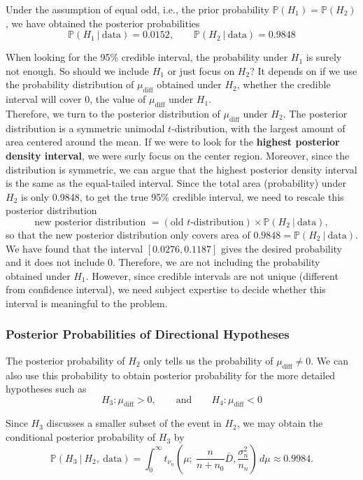 \documentclass{article}
\begin{document}
Under the assumption of equal odd, i.e., the prior probability $\mathbb{P}(H_1)=\mathbb{P}(H_2)$, we have obtained the posterior probabilities
$$ \mathbb{P}(H_1~|~\text{data}) = 0.0152,\qquad \mathbb{P}(H_2~|~\text{data}) = 0.9848 $$

When looking for the 95\% credible interval, the probability under $H_1$ is surely not enough. So should we include $H_1$ or just focus on $H_2$? It depends on if we use the probability distribution of $\mu_\text{diff}$ obtained under $H_2$, whether the credible interval will cover 0, the value of $\mu_\text{diff}$ under $H_1$.\\

Therefore, we turn to the posterior distribution of $\mu_\text{diff}$ under $H_2$. The posterior distribution is a symmetric unimodal $t$-distribution, with the largest amount of area centered around the mean. If we were to look for the \textbf{highest posterior density interval}, we were surly focus on the center region. Moreover, since the distribution is symmetric, we can argue that the highest posterior density interval is the same as the equal-tailed interval. Since the total area (probability) under $H_2$ is only 0.9848, to get the true 95\% credible interval, we need to rescale this posterior distribution 
$$ \text{new posterior distribution }= (\text{old $t$-distribution})\times\mathbb{P}(H_2~|~\text{data}), $$ so that the new posterior distribution only covers area of $0.9848 = \mathbb{P}(H_2~|~\text{data})$. We have found that the interval $[0.0276, 0.1187]$ gives the desired probability and it does not include 0. Therefore, we are not including the probability obtained under $H_1$. However, since credible intervals are not unique (different from confidence interval), we need subject expertise to decide whether this interval is meaningful to the problem.

\subsubsection*{Posterior Probabilities of Directional Hypotheses}

The posterior probability of $H_2$ only tells us the probability of $\mu_\text{diff}\neq 0$. We can also use this probability to obtain posterior probability for the more detailed hypotheses such as
$$ H_3: \mu_\text{diff} > 0,\qquad \text{and}\qquad H_4:\mu_\text{diff} < 0 $$

Since $H_3$ discusses a smaller subset of the event in $H_2$, we may obtain the conditional posterior probability of $H_3$ by 
$$ \mathbb{P}(H_3~|~H_2,\ \text{data}) = \int_0^\infty t_{\nu_n}\left(\mu;\ \frac{n}{n+n_0}\bar{D}, \frac{\sigma_n^2}{n_n}\right)\, d\mu \approx 0.9984. $$
\end{document}
